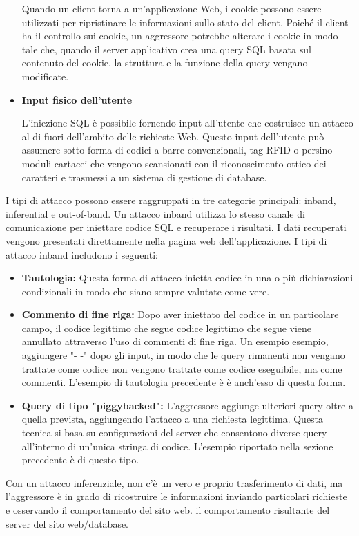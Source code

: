 \begin{itemize}
    Quando un client torna a un'applicazione Web, i cookie possono essere utilizzati per ripristinare le informazioni sullo stato del client. Poiché il client ha il controllo sui cookie, un aggressore potrebbe alterare i cookie in modo tale che, quando il server applicativo crea una query SQL basata sul contenuto del cookie, la struttura e la funzione della query vengano modificate.
    
    \item \textbf{Input fisico dell'utente}
    
    L'iniezione SQL è possibile fornendo input all'utente che costruisce un attacco al di fuori dell'ambito delle richieste Web. Questo input dell'utente può assumere sotto forma di codici a barre convenzionali, tag RFID o persino moduli cartacei che vengono scansionati con il riconoscimento ottico dei caratteri e trasmessi a un sistema di gestione di database.
\end{itemize}
I tipi di attacco possono essere raggruppati in tre categorie principali: inband, inferential e out-of-band. Un attacco inband utilizza lo stesso canale di comunicazione per iniettare codice SQL e recuperare i risultati. I dati recuperati vengono presentati direttamente nella pagina web dell'applicazione. I tipi di attacco inband includono i seguenti:
\begin{itemize}
    \item \textbf{Tautologia:} Questa forma di attacco inietta codice in una o più dichiarazioni condizionali in modo che siano sempre valutate come vere. 
    
    \item \textbf{Commento di fine riga:} Dopo aver iniettato del codice in un particolare campo, il codice legittimo che segue codice legittimo che segue viene annullato attraverso l'uso di commenti di fine riga. Un esempio esempio, aggiungere "- -" dopo gli input, in modo che le query rimanenti non vengano trattate come codice non vengono trattate come codice eseguibile, ma come commenti. L'esempio di tautologia precedente è è anch'esso di questa forma.
    
    \item \textbf{Query di tipo "piggybacked":} L'aggressore aggiunge ulteriori query oltre a quella prevista, aggiungendo l'attacco a una richiesta legittima. Questa tecnica si basa su configurazioni del server che consentono diverse query all'interno di un'unica stringa di codice. L'esempio riportato nella sezione precedente è di questo tipo.
\end{itemize}
Con un attacco inferenziale, non c'è un vero e proprio trasferimento di dati, ma l'aggressore è in grado di ricostruire le informazioni inviando particolari richieste e osservando il comportamento del sito web.
il comportamento risultante del server del sito web/database. 

